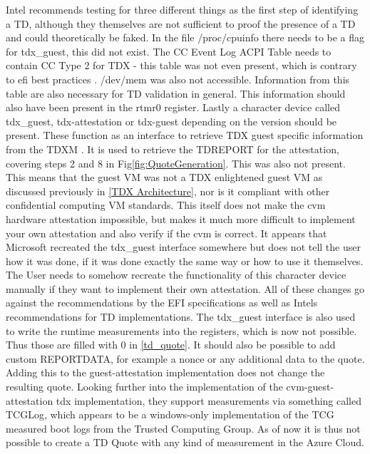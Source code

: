 \label{Issues-with-azure-td}
Intel recommends testing for three different things as the first step of identifying a TD, although they themselves are not sufficient to proof the presence of a TD and could theoretically be faked. In the file /proc/cpuinfo there needs to be a flag for tdx\_guest, this did not exist. The CC Event Log ACPI Table needs to contain CC Type 2 for \Gls{TDX} - this table was not even present, which is contrary to efi best practices \cite{uefi_forum_inc_acpi_docu_2022}. /dev/mem was also not accessible. Information from this table are also necessary for TD validation in general. This information should also have been present in the rtmr0 register. Lastly a character device called tdx\_guest, tdx-attestation or tdx-guest depending on the version should be present. These function as an interface to retrieve \Gls{TDX} guest specific information from the \Gls{TDXM} \cite{linux_kernel_development_community_tdx_2024}. It is used to retrieve the TDREPORT for the attestation, covering steps 2 and 8 in Fig\ref{fig:QuoteGeneration}. This was also not present. This means that the guest VM was not a \Gls{TDX} enlightened guest VM as discussed previously in \cref{TDX Architecture}, nor is it compliant with other confidential computing VM standards. This itself does not make the cvm hardware attestation impossible, but makes it much more difficult to implement your own attestation and also verify if the cvm is correct. It appears that Microsoft recreated the tdx\_guest interface somewhere but does not tell the user how it was done, if it was done exactly the same way or how to use it themselves. The User needs to somehow recreate the functionality of this character device manually if they want to implement their own attestation. All of these changes go against the recommendations by the EFI specifications as well as Intels recommendations for TD implementations.
The tdx\_guest interface is also used to write the runtime measurements into the registers, which is now not possible. Thus those are filled with 0 in \cref{td_quote}. It should also be possible to add custom REPORTDATA, for example a nonce or any additional data to the quote. Adding this to the guest-attestation implementation does not change the resulting quote.
Looking further into the implementation of the cvm-guest-attestation tdx implementation, they support measurements via something called TCGLog, which appears to be a windows-only implementation of the \guillemotright TCG measured boot logs \guillemotleft \cite{graeber_mattifestationtcglogtools_2023} from the Trusted Computing Group. As of now it is thus not possible to create a TD Quote with any kind of measurement in the Azure Cloud. 
